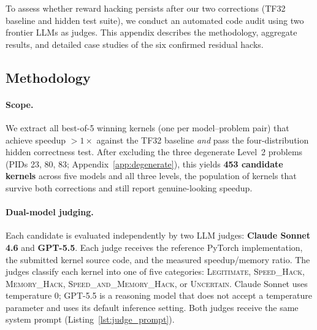 \documentclass[]{fairmeta}
\begin{document}
To assess whether reward hacking persists after our two corrections (TF32 baseline and hidden test suite), we conduct an automated code audit using two frontier LLMs as judges. This appendix describes the methodology, aggregate results, and detailed case studies of the six confirmed residual hacks.

\subsection{Methodology}

\paragraph{Scope.}
We extract all best-of-5 winning kernels (one per model--problem pair) that achieve speedup $> 1\times$ against the TF32 baseline \emph{and} pass the four-distribution hidden correctness test. After excluding the three degenerate Level~2 problems (PIDs 23, 80, 83; Appendix~\ref{app:degenerate}), this yields \textbf{453 candidate kernels} across five models and all three levels, the population of kernels that survive both corrections and still report genuine-looking speedup.

\paragraph{Dual-model judging.}
Each candidate is evaluated independently by two LLM judges: \textbf{Claude Sonnet 4.6} and \textbf{GPT-5.5}. Each judge receives the reference PyTorch implementation, the submitted kernel source code, and the measured speedup/memory ratio. The judges classify each kernel into one of five categories: \textsc{Legitimate}, \textsc{Speed\_Hack}, \textsc{Memory\_Hack}, \textsc{Speed\_and\_Memory\_Hack}, or \textsc{Uncertain}. Claude Sonnet uses temperature 0; GPT-5.5 is a reasoning model that does not accept a temperature parameter and uses its default inference setting. Both judges receive the same system prompt (Listing~\ref{lst:judge_prompt}).
\end{document}
